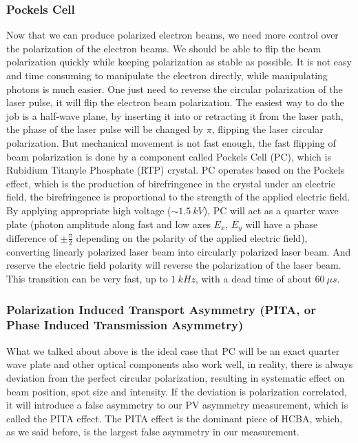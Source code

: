 \subsubsection{Pockels Cell}
Now that we can produce polarized electron beams, we need more control over the
polarization of the electron beams. We should be able to flip the beam polarization
quickly while keeping polarization as stable as possible. It is not easy and time
consuming to manipulate the electron directly, while manipulating photons is much 
easier. One just need to reverse the circular polarization of the laser pulse,
it will flip the electron beam polarization. The easiest way to do the job is
a half-wave plane, by inserting it into or retracting it from the laser path,
the phase of the laser pulse will be changed by $\pi$, flipping the laser
circular polarization. But mechanical movement is not fast enough, the fast 
flipping of beam polarization is done by a component called Pockels Cell (PC),
which is Rubidium Titanyle Phosphate (RTP) crystal. PC operates based on the 
Pockels effect, which is the production of birefringence in the crystal under
an electric field, the birefringence is proportional to the strength of the
applied electric field. By applying appropriate high voltage ($\sim 1.5\ kV$),
PC will act as a quarter wave plate (photon amplitude along fast and low axes
$E_x$, $E_y$ will have a phase difference of $\pm \frac{\pi}{2}$ depending on
the polarity of the applied electric field), converting linearly polarized laser beam
into circularly polarized laser beam. And reserve the electric field polarity
will reverse the polarization of the laser beam. This transition can be very
fast, up to $1 \ kHz$, with a dead time of about $60\ \mu s$.

\subsubsection{Polarization Induced Transport Asymmetry (PITA, or Phase Induced Transmission Asymmetry) \cite{Cary2019}}
What we talked about above is the ideal case that PC will be an exact quarter wave
plate and other optical components also work well, in reality, there is always 
deviation from the perfect circular polarization,
resulting in systematic effect on beam position, spot size and intensity. If the deviation 
is polarization correlated, it will introduce a false asymmetry to our PV asymmetry 
measurement, which is called the PITA effect. The PITA effect is the dominant
piece of HCBA, which, as we said before, is the largest false asymmetry in
our measurement.

